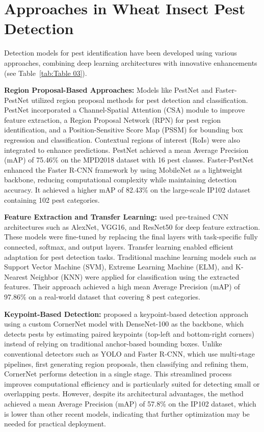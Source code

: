 \section{Approaches in Wheat Insect Pest Detection}

Detection models for pest identification have been developed using various approaches, combining deep learning architectures with innovative enhancements (see Table~\ref{tab:Table 03}).

\textbf{Region Proposal-Based Approaches:} Models like PestNet \parencite{liu2019pestnet} and Faster-PestNet \parencite{ali2023faster} utilized region proposal methods for pest detection and classification. PestNet incorporated a Channel-Spatial Attention (CSA) module to improve feature extraction, a Region Proposal Network (RPN) for pest region identification, and a Position-Sensitive Score Map (PSSM) for bounding box regression and classification. Contextual regions of interest (RoIs) were also integrated to enhance predictions. PestNet achieved a mean Average Precision (mAP) of 75.46\% on the MPD2018 dataset with 16 pest classes. Faster-PestNet enhanced the Faster R-CNN framework by using MobileNet as a lightweight backbone, reducing computational complexity while maintaining detection accuracy. It achieved a higher mAP of 82.43\% on the large-scale IP102 dataset containing 102 pest categories.

\textbf{Feature Extraction and Transfer Learning:} \parencite{turkoglu2019plant} used pre-trained CNN architectures such as AlexNet, VGG16, and ResNet50 for deep feature extraction. These models were fine-tuned by replacing the final layers with task-specific fully connected, softmax, and output layers. Transfer learning enabled efficient adaptation for pest detection tasks. Traditional machine learning models such as Support Vector Machine (SVM), Extreme Learning Machine (ELM), and K-Nearest Neighbor (KNN) were applied for classification using the extracted features. Their approach achieved a high mean Average Precision (mAP) of 97.86\% on a real-world dataset that covering 8 pest categories.

\textbf{Keypoint-Based Detection:} \parencite{albattah2023custom} proposed a keypoint-based detection approach using a custom CornerNet model with DenseNet-100 as the backbone, which detects pests by estimating paired keypoints (top-left and bottom-right corners) instead of relying on traditional anchor-based bounding boxes. Unlike conventional detectors such as YOLO and Faster R-CNN, which use multi-stage pipelines, first generating region proposals, then classifying and refining them, CornerNet performs detection in a single stage. This streamlined process improves computational efficiency and is particularly suited for detecting small or overlapping pests. However, despite its architectural advantages, the method achieved a mean Average Precision (mAP) of 57.8\% on the IP102 dataset, which is lower than other recent models, indicating that further optimization may be needed for practical deployment.

